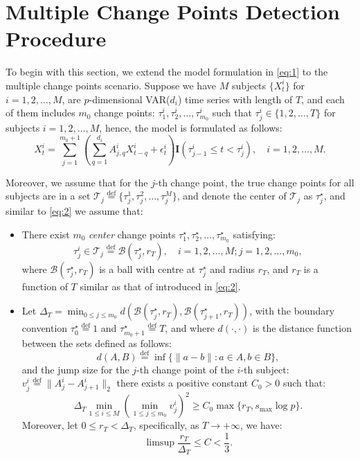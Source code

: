 \documentclass[11pt]{article}
\begin{document}
\section{Multiple Change Points Detection Procedure}\label{sec:multi-cp}
To begin with this section, we extend the model formulation in \eqref{eq:1} to the multiple change points scenario. Suppose we have $M$ subjects $\{X_t^i\}$ for $i=1,2,\dots,M$, are $p$-dimensional VAR($d_i$) time series with length of $T$, and each of them includes $m_0$ change points: $\tau_1^i, \tau_2^i, \dots, \tau^i_{m_0}$ such that $\tau_j^i \in \{1,2,\dots, T\}$ for subjects $i=1,2,\dots, M$, hence, the model is formulated as follows:
\begin{equation}
    \label{eq:multi-cp}
    X_t^i = \sum_{j=1}^{m_0+1} \left( \sum_{q=1}^{d_i} A^i_{j,q}X_{t-q}^i + \epsilon_t^i \right)\mathbf{I}(\tau_{j-1}^i \leq t < \tau_j^i),\quad i=1,2,\dots, M.
\end{equation}

Moreover, we assume that for the $j$-th change point, the true change points for all subjects are in a set $\mathcal{T}_j \overset{\text{def}}{=} \{\tau_j^1, \tau_j^2, \dots, \tau_j^M\}$, and denote the center of $\mathcal{T}_j$ as $\tau_j^\star$, and similar to \eqref{eq:2} we assume that:
\begin{itemize}
    \item[(H1')] There exist $m_0$ \emph{center} change points $\tau_1^\star, \tau_2^\star, \dots, \tau_{m_0}^\star$ satisfying:
    \begin{equation}
        \label{eq:31}
        \tau_j^i \in \mathcal{T}_j \overset{\text{def}}{=} \mathcal{B}(\tau_j^\star, r_T),\quad i=1,2,\dots, M; j=1,2,\dots, m_0,
    \end{equation}
    where $\mathcal{B}(\tau_j^\star, r_T)$ is a ball with centre at $\tau_j^\star$ and radius $r_T$, and $r_T$ is a function of $T$ similar as that of introduced in \eqref{eq:2}.
    
    \item[(H2')] Let $\Delta_T = \min_{0\leq j \leq m_0} d\left(\mathcal{B}(\tau_j^\star, r_T), \mathcal{B}(\tau_{j+1}^\star, r_T)\right)$, with the boundary convention $\tau_0^\star \overset{\text{def}}{=} 1$ and $\tau_{m_0+1}^\star \overset{\text{def}}{=} T$, and where $d(\cdot, \cdot)$ is the distance function between the sets defined as follows:
    \begin{equation*}
        d(A, B) \overset{\text{def}}{=} \inf\{ \|a - b\|: a \in A, b \in B \},
    \end{equation*}
    and the jump size for the $j$-th change point of the $i$-th subject: $v_j^i \overset{\text{def}}{=} \|A_j^i - A_{j+1}^i\|_2$
    there exists a positive constant $C_0>0$ such that:
    \begin{equation*}
        \Delta_T \min_{1\leq i \leq M}(\min_{1\leq j \leq m_0}v_j^i)^2 \geq C_0 \max\{r_T, s_{\max}\log p\}.
    \end{equation*}
    Moreover, let $0 \leq r_T < \Delta_T$, specifically, as $T \to +\infty$, we have:
    \begin{equation*}
        \limsup\frac{r_T}{\Delta_T} \leq C < \frac{1}{3}.
    \end{equation*}
\end{itemize}
\end{document}
